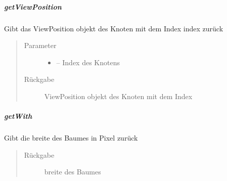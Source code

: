\documentclass[letterpaper,10pt,ngerman]{sphinxmanual}
\begin{document}
\subparagraph{getViewPosition}
\label{\detokenize{com/linuxluigi/edu/list/BinaryLinkedList:getviewposition}}

\begin{fulllineitems}
\label{\detokenize{com/linuxluigi/edu/list/BinaryLinkedList:com.linuxluigi.edu.list.BinaryLinkedList.getViewPosition(int)}}
Gibt das ViewPosition objekt des Knoten mit dem Index index zurück
\begin{quote}\begin{description}
\item[{Parameter}] \leavevmode\begin{itemize}
\item {} 
 -- Index des Knotens

\end{itemize}

\item[{Rückgabe}] \leavevmode
ViewPosition objekt des Knoten mit dem Index

\end{description}\end{quote}

\end{fulllineitems}



\subparagraph{getWith}
\label{\detokenize{com/linuxluigi/edu/list/BinaryLinkedList:getwith}}

\begin{fulllineitems}
\label{\detokenize{com/linuxluigi/edu/list/BinaryLinkedList:com.linuxluigi.edu.list.BinaryLinkedList.getWith()}}
Gibt die breite des Baumes in Pixel zurück
\begin{quote}\begin{description}
\item[{Rückgabe}] \leavevmode
breite des Baumes

\end{description}\end{quote}

\end{fulllineitems}
\end{document}
